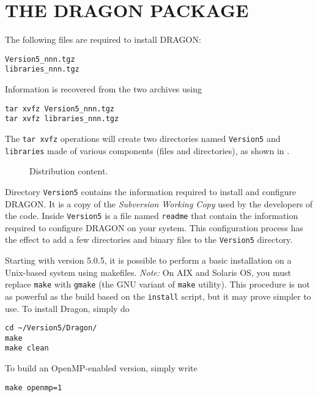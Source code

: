 \section{THE DRAGON PACKAGE}\label{sect:DragonExportPackage}

The following files are required to install DRAGON:

\begin{verbatim}
Version5_nnn.tgz
libraries_nnn.tgz
\end{verbatim}

\vskip 0.08cm

Information is recovered from the two archives using
\begin{verbatim}
tar xvfz Version5_nnn.tgz
tar xvfz libraries_nnn.tgz
\end{verbatim}

\noindent The {\tt tar xvfz} operations will create two directories named {\tt Version5} and {\tt
libraries} made of various components (files and directories), as shown in .

\begin{figure}[h!]  
\begin{center} 
\epsfxsize=10cm \centerline{ }
\parbox{16cm}{\caption{Distribution content.}\label{fig:tree2}}    
\end{center}  
\end{figure}

Directory {\tt Version5} contains the information required to install and configure
DRAGON. It is a copy of the {\sl Subversion Working Copy} used by the developers of the
code. Inside {\tt Version5} is a file named {\tt readme} that contain the
information required to configure DRAGON on your system. This configuration
process has the effect to add a few directories and binary files to the
{\tt Version5} directory.

\vskip 0.08cm

Starting with version 5.0.5, it is possible to perform a basic installation on a Unix-based system
using makefiles. {\sl Note:} On AIX and Solaris OS, you must replace {\tt make} with {\tt gmake} (the
GNU variant of {\tt make} utility). This procedure is not as powerful as the build based on the {\tt install}
script, but it may prove simpler to use. To install Dragon, simply do
\begin{verbatim}
cd ~/Version5/Dragon/
make
make clean
\end{verbatim}

\noindent To build an OpenMP-enabled version, simply write
\begin{verbatim}
make openmp=1
\end{verbatim}

